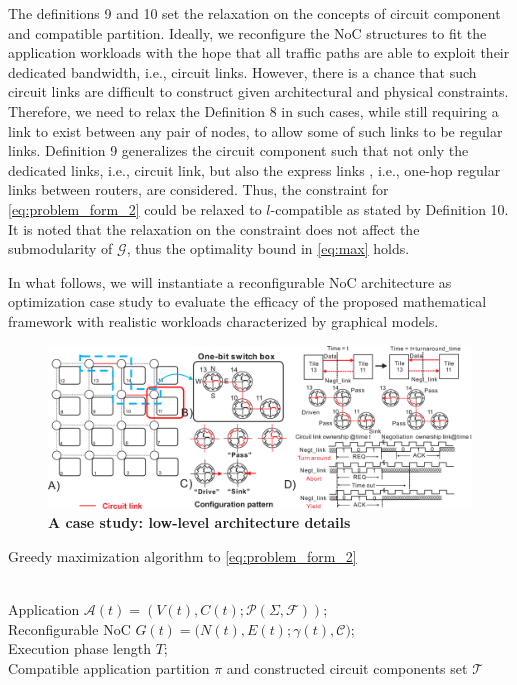 {{The definitions 9 and 10 set the relaxation on the concepts of circuit component and compatible partition. Ideally, we reconfigure the NoC structures to fit the application workloads with the hope that all traffic paths are able to exploit their dedicated bandwidth, i.e., circuit links. However, there is a chance that such circuit links are difficult to construct given architectural and physical constraints. Therefore, we need to relax the Definition 8 in such cases, while still requiring a link to exist between any pair of nodes, to allow some of such links to be regular links. Definition 9 generalizes the circuit component such that not only the dedicated links, i.e., circuit link, but also the express links , i.e., one-hop regular links between routers, are considered. Thus, the constraint for \eqref{eq:problem_form_2} could be relaxed to $l$-compatible as stated by Definition 10. It is noted that the relaxation on the constraint does not affect the submodularity of $\mathcal G$, thus the optimality bound in \eqref{eq:max} holds.

 In what follows, we will instantiate a reconfigurable NoC architecture as optimization case study to evaluate the efficacy of the proposed mathematical framework with realistic workloads characterized by graphical models.

\begin{figure}[tb]
  \centering
  \includegraphics[width=1\columnwidth]{arch_overall.eps}
  \vskip -1mm
  \caption{\textbf{A case study: low-level architecture details} }
  \label{fig:Arch}
  \vskip -7mm
\end{figure}
\begin{algorithm}[t]
\caption{ Greedy maximization algorithm to \eqref{eq:problem_form_2}}
\label{alg:maximization}
\begin{algorithmic}[1]
\REQUIRE ~~\\
    Application  $\mathcal A(t)=(V(t),C(t);\mathcal P(\Sigma,\mathcal F))$; \\
    Reconfigurable NoC $G(t)=(N(t),E(t);\gamma(t),$$\mathcal C)$;\\
    Execution phase length $T$;
    \ENSURE ~~\\
    Compatible application partition $\pi$ and constructed circuit components set $\mathcal T$


\end{algorithmic}
\end{algorithm}}}
